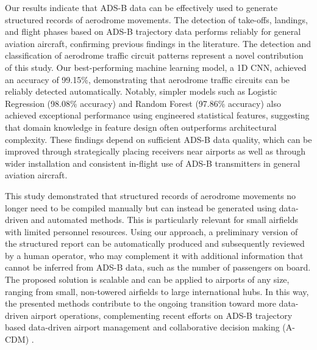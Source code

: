 \documentclass[
  manuscript=proceedings,  %
  layout=preprint,         %
  year=2025,
  volume=x,
]{extra/joas}
\begin{document}
Our results indicate that ADS-B data can be effectively used to generate structured records of aerodrome movements. The detection of take-offs, landings, and flight phases based on ADS-B trajectory data performs reliably for general aviation aircraft, confirming previous findings in the literature. The detection and classification of aerodrome traffic circuit patterns represent a novel contribution of this study. Our best-performing machine learning model, a 1D CNN, achieved an accuracy of 99.15\%, demonstrating that aerodrome traffic circuits can be reliably detected automatically. Notably, simpler models such as Logistic Regression (98.08\% accuracy) and Random Forest (97.86\% accuracy) also achieved exceptional performance using engineered statistical features, suggesting that domain knowledge in feature design often outperforms architectural complexity. These findings depend on sufficient ADS-B data quality, which can be improved through strategically placing receivers near airports as well as through wider installation and consistent in-flight use of ADS-B transmitters in general aviation aircraft.

This study demonstrated that structured records of aerodrome movements no longer need to be compiled manually but can instead be generated using data-driven and automated methods. This is particularly relevant for small airfields with limited personnel resources. Using our approach, a preliminary version of the structured report can be automatically produced and subsequently reviewed by a human operator, who may complement it with additional information that cannot be inferred from ADS-B data, such as the number of passengers on board. The proposed solution is scalable and can be applied to airports of any size, ranging from small, non-towered airfields to large international hubs. In this way, the presented methods contribute to the ongoing transition toward more data-driven airport operations, complementing recent efforts on ADS-B trajectory based data-driven airport management \cite{SCHULTZ2022} and collaborative decision making (A-CDM) \cite{a_cdm_lite}.
\end{document}
